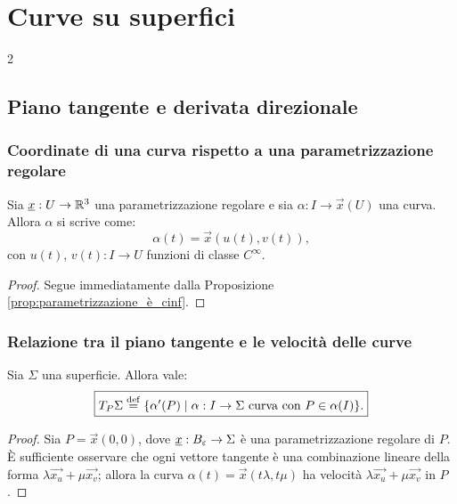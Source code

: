 \chapter{Curve su superfici}
\setlength{\parindent}{2pt}

\begin{multicols*}{2}
    \section{Piano tangente e derivata direzionale}

    \subsection{Coordinate di una curva rispetto a una parametrizzazione regolare}

    \begin{proposition} \label{prop:coordinate_curva_parametrizzazione}
        Sia ${\underline{x}} : U \to \mathbb{R}^3$ una parametrizzazione regolare e sia $\alpha : I \to \vec{x}(U)$
        una curva. Allora $\alpha$ si scrive come:
        \[
            \alpha(t) = \vec{x}(u(t), v(t)),
        \]
        con $u(t)$, $v(t) : I \to U$ funzioni di classe $C^\infty$.
    \end{proposition}

    \begin{proof}
        Segue immediatamente dalla Proposizione \ref{prop:parametrizzazione_è_cinf}.
    \end{proof}

    \subsection{Relazione tra il piano tangente e le velocità delle curve}

    \begin{proposition}
        Sia $\Sigma$ una superficie. Allora vale:
        \[
            \boxed{T_P \Sigma \overset{\mathrm{def}}{=} \{ \alpha'(P) \mid \alpha : I \to \Sigma \textnormal{ curva con } P \in \alpha(I) \}.}
        \]
    \end{proposition}

    \begin{proof}
        Sia $P = \vec{x}(0, 0)$, dove ${\underline{x}} : B_\varepsilon \to \Sigma$ è una parametrizzazione regolare di $P$.
        È sufficiente osservare che ogni vettore tangente è una combinazione lineare della forma
        $\lambda \vec{x_u} + \mu \vec{x_v}$; allora la curva
        $\alpha(t) = \vec{x}(t \lambda, t \mu)$ ha velocità $\lambda \vec{x_u} + \mu \vec{x_v}$ in
        $P$.
    \end{proof}


\end{multicols*}
